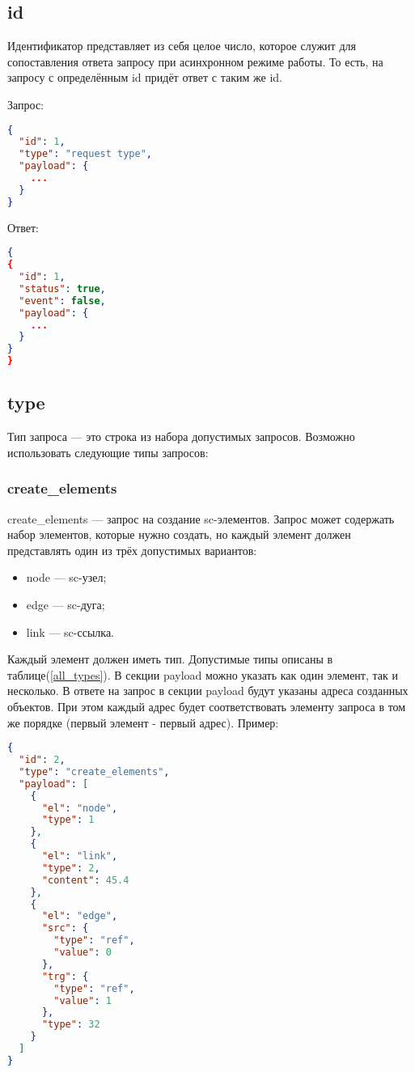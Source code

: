 \subsection{id}
Идентификатор представляет из себя целое число, которое служит для сопоставления ответа запросу при асинхронном режиме работы. То есть, на запросу с определённым id придёт ответ с таким же id.

Запрос:
\begin{lstlisting}[language=json,firstnumber=1]
{
  "id": 1,
  "type": "request type",
  "payload": {
    ...
  }
}
\end{lstlisting}
Ответ:
\begin{lstlisting}[language=json,firstnumber=1]
{
{
  "id": 1,
  "status": true,
  "event": false, 
  "payload": {
    ...
  }
}
}
\end{lstlisting}


\subsection{type}
Тип запроса --- это строка из набора допустимых запросов. Возможно использовать следующие типы запросов: 
\subsubsection{create\_elements}
create\_elements --- запрос на создание sc-элементов.  Запрос может содержать набор элементов, которые нужно создать, но каждый элемент должен представлять один из трёх допустимых вариантов: 
\begin{itemize}
\item node --- sc-узел;
\item edge --- sc-дуга;
\item link --- sc-ссылка.
\end{itemize}
Каждый элемент должен иметь тип. Допустимые типы описаны в таблице(\ref{all_types}).
В секции payload можно указать как один элемент, так и несколько. В ответе на запрос в секции payload будут указаны адреса созданных объектов. При этом каждый адрес будет соответствовать элементу запроса в том же порядке (первый элемент - первый адрес). 
Пример:
\begin{lstlisting}[language=json,firstnumber=1]
{
  "id": 2,
  "type": "create_elements",
  "payload": [
    {
      "el": "node",
      "type": 1
    },
    {
      "el": "link",
      "type": 2,
      "content": 45.4
    },
    {
      "el": "edge",
      "src": {
        "type": "ref",
        "value": 0
      },
      "trg": {
        "type": "ref",
        "value": 1
      },
      "type": 32
    }
  ]
}
\end{lstlisting}

